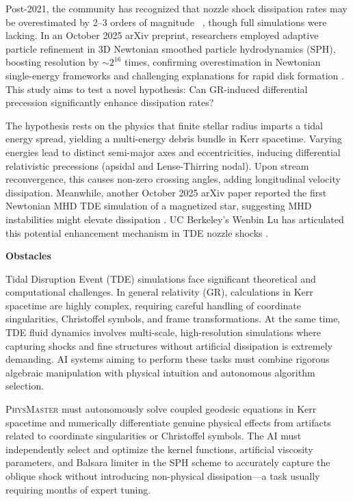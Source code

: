 \documentclass[11pt, a4paper, logo, copyright, nonumbering]{SAI}
\newcommand{\agent}{\textsc{PhysMaster}\xspace}
\begin{document}
Post-2021, the community has recognized that nozzle shock dissipation rates may be overestimated by 2--3 orders of magnitude ~\citep{guillochon2015dark,bonnerot2016disc}, though full simulations were lacking. In an October 2025 arXiv preprint, researchers employed adaptive particle refinement in 3D Newtonian smoothed particle hydrodynamics (SPH), boosting resolution by $\sim 2^{16}$ times, confirming overestimation in Newtonian single-energy frameworks and challenging explanations for rapid disk formation \citep{hu2025converged}. This study aims to test a novel hypothesis: Can GR-induced differential precession significantly enhance dissipation rates?

The hypothesis rests on the physics that finite stellar radius imparts a tidal energy spread, yielding a multi-energy debris bundle in Kerr spacetime. Varying energies lead to distinct semi-major axes and eccentricities, inducing differential relativistic precessions (apsidal and Lense-Thirring nodal). Upon stream reconvergence, this causes non-zero crossing angles, adding longitudinal velocity dissipation. Meanwhile, another October 2025 arXiv paper reported the first Newtonian MHD TDE simulation of a magnetized star, suggesting MHD instabilities might elevate dissipation \citep{abolmasov2025tidal}. UC Berkeley's Wenbin Lu has articulated this potential enhancement mechanism in TDE nozzle shocks \citep{bonnerot2022nozzle}.

\noindent \textbf{Obstacles}

Tidal Disruption Event (TDE) simulations face significant theoretical and computational challenges. In general relativity (GR), calculations in Kerr spacetime are highly complex, requiring careful handling of coordinate singularities, Christoffel symbols, and frame transformations. At the same time, TDE fluid dynamics involves multi-scale, high-resolution simulations where capturing shocks and fine structures without artificial dissipation is extremely demanding. AI systems aiming to perform these tasks must combine rigorous algebraic manipulation with physical intuition and autonomous algorithm selection.

\agent must autonomously solve coupled geodesic equations in Kerr spacetime and numerically differentiate genuine physical effects from artifacts related to coordinate singularities or Christoffel symbols. The AI must independently select and optimize the kernel functions, artificial viscosity parameters, and Balsara limiter in the SPH scheme to accurately capture the oblique shock without introducing non-physical dissipation---a task usually requiring months of expert tuning.
\end{document}
